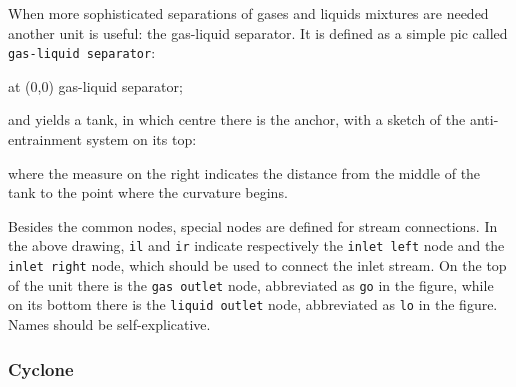 \documentclass[12pt]{article}						%
\newcommand*{\chpn}[1]{\texttt{#1}}				%
\newcommand*{\chpp}[1]{\texttt{#1}}				%
\begin{document}
When more sophisticated separations of gases and liquids mixtures are needed
another unit is useful: the gas-liquid separator. It is defined as a simple pic
called \chpp{gas-liquid separator}:
\begin{chpcode}
	\pic at (0,0) {gas-liquid separator};
\end{chpcode}
and yields a tank, in which centre there is the anchor, with a sketch of the
anti-entrainment system on its top:
\begin{center}
\end{center}
where the measure on the right indicates the distance from the middle of the tank
to the point where the curvature begins.

Besides the common nodes, special nodes are defined for stream connections. In
the above drawing, \chpn{il} and \chpn{ir} indicate respectively the
\chpn{inlet left} node and the \chpn{inlet right} node, which should be used
to connect the inlet stream. On the top of the unit there is the
\chpn{gas outlet} node, abbreviated as \chpn{go} in the figure, while on its
bottom there is the \chpn{liquid outlet} node, abbreviated as \chpn{lo} in the
figure. Names should be self-explicative.

\subsubsection{Cyclone}
\end{document}
